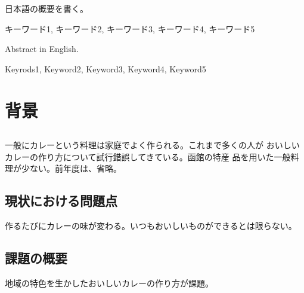 \documentclass[openany,11pt,papersize]{jsbook}
\begin{document}
%
\maketitle

\frontmatter

\begin{jabstract} 日本語の概要を書く。
\begin{jkeyword}
キーワード1, キーワード2, キーワード3, キーワード4, キーワード5
\end{jkeyword}
\end{jabstract}

\begin{eabstract} Abstract in English. 
\begin{ekeyword}
Keyrods1, Keyword2, Keyword3, Keyword4, Keyword5
\end{ekeyword}
\end{eabstract}

\tableofcontents%


\mainmatter%

\chapter{背景}


\section{}

一般にカレーという料理は家庭でよく作られる。これまで多くの人が
おいしいカレーの作り方について試行錯誤してきている。函館の特産
品を用いた一般料理が少ない。前年度は、省略。

\section{現状における問題点}
作るたびにカレーの味が変わる。いつもおいしいものができるとは限らない。

\section{課題の概要}\label{sec:gaiyou}
地域の特色を生かしたおいしいカレーの作り方が課題。
\end{document}
